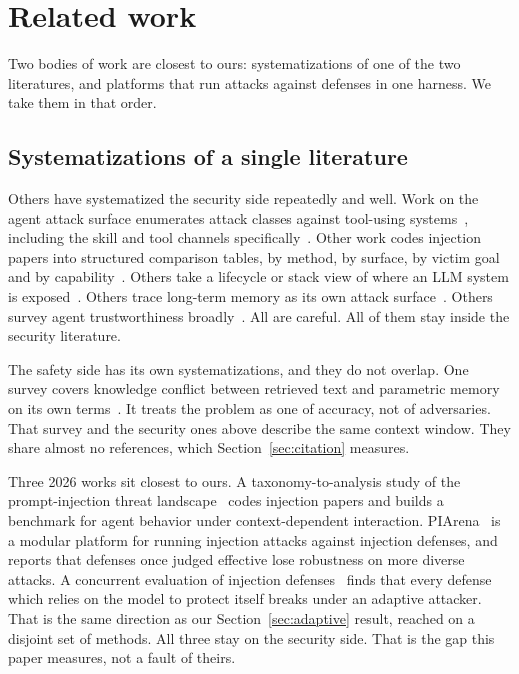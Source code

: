 \section{Related work} \label{sec:related}

Two bodies of work are closest to ours: systematizations of one of the two
literatures, and platforms that run attacks against defenses in one harness.
We take them in that order.

\subsection{Systematizations of a single literature}

Others have systematized the security side repeatedly and well. Work on the
agent attack surface enumerates attack classes against tool-using
systems~\cite{dehghantanha-2026-sok,chu-2026-systematic}, including the skill
and tool channels specifically~\cite{jiang-2026-sok}. Other work codes
injection papers into structured comparison tables, by method, by surface, by
victim goal and by
capability~\cite{yusifov-2026-taxonomy,duarte-2026-systematic}. Others take a
lifecycle or stack view of where an LLM system is
exposed~\cite{natanzi-2026-lifecycle,nemure-2026-llm}. Others trace long-term
memory as its own attack surface~\cite{lin-2026-survey}. Others survey agent
trustworthiness broadly~\cite{qi-2026-trustworthy,mohan-2026-agent}. All are
careful. All of them stay inside the security literature.

The safety side has its own systematizations, and they do not
overlap. One survey covers knowledge conflict between retrieved text and
parametric memory on its own terms~\cite{xu-2024-knowledge}. It treats the
problem as one of accuracy, not of adversaries. That survey and the security
ones above describe the same context window. They share almost no references, which
Section~\ref{sec:citation} measures.

Three 2026 works sit closest to ours. A taxonomy-to-analysis study of the
prompt-injection threat landscape~\cite{wang-2026-landscape} codes injection
papers and builds a benchmark for agent behavior under context-dependent
interaction. PIArena~\cite{piarena-2026} is a modular platform for running
injection attacks against injection defenses, and reports that defenses once
judged effective lose robustness on more diverse attacks. A concurrent
evaluation of injection defenses~\cite{pidefense-eval-2026} finds that every
defense which relies on the model to protect itself breaks under an adaptive
attacker. That is the same direction as our Section~\ref{sec:adaptive} result,
reached on a disjoint set of methods. All three stay on the security side. That is the gap this paper measures,
not a fault of theirs.

